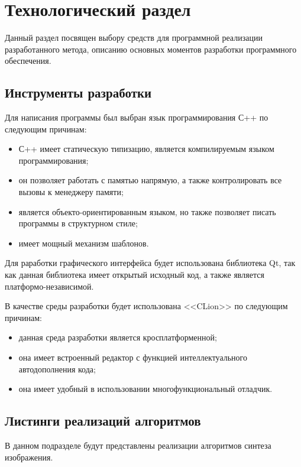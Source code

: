 \chapter{Технологический раздел}

Данный раздел посвящен выбору средств для программной реализации разработанного метода, описанию основных моментов разработки программного обеспечения.

\section{Инструменты разработки}

Для написания программы был выбран язык программирования С++\cite{c++} по следующим причинам:

\begin{itemize}
	\item С++ имеет статическую типизацию, является компилируемым языком программирования;
	\item он позволяет работать с памятью напрямую, а также контролировать все вызовы к менеджеру памяти;
	\item является объекто-ориентированным языком, но также позволяет писать программы в структурном стиле;
	\item имеет мощный механизм шаблонов.
\end{itemize}

Для раработки графического интерфейса будет использована библиотека Qt\cite{qt}, так как данная библиотека имеет открытый исходный код, а также является платформо-независимой.

В качестве среды разработки будет использована <<CLion>>\cite{clion} по следующим причинам:

\begin{itemize}
	\item данная среда разработки является кросплатформенной;
	\item она имеет встроенный редактор с функцией интеллектуального автодополнения кода;
	\item она имеет удобный в использовании многофункциональный отладчик.
\end{itemize}

\section{Листинги реализаций алгоритмов}

В данном подразделе будут представлены реализации алгоритмов синтеза изображения.


